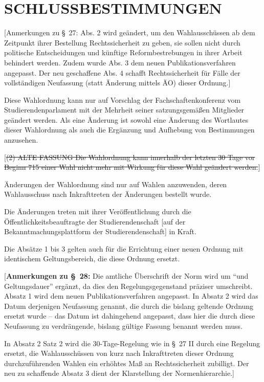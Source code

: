 \documentclass[%
draft,%
multilinesections%
]{fswo}
\newcommand\oldT[1]  {{\color{Gray}[\st{#1}]}}
\newcommand\newT[1]  {{\color{Green}[#1]}}
\newcommand\bemFr[1] {{\color{Red}[#1]}}
\newcommand\oldT[1]{}%
\newcommand\newT[1]{#1}
\newcommand\bemFr[1]{}%
\begin{document}
\section{SCHLUSSBESTIMMUNGEN}
\bemFr{Anmerkungen zu \S~27: Abs. 2 wird geändert, um den Wahlausschüssen ab dem Zeitpunkt ihrer Bestellung Rechtssicherheit zu geben, sie sollen nicht durch politische Entscheidungen und künftige Reformbestrebungen in ihrer Arbeit behindert werden.
Zudem wurde Abs. 3 dem neuen Publikationsverfahren angepasst. Der neu geschaffene Abs. 4 schafft Rechtssicherheit für Fälle der vollständigen Neufassung (statt Änderung mittels ÄO) dieser Ordnung.}

\begin{contract}
Diese Wahlordnung kann nur auf Vorschlag der Fachschaftenkonferenz vom Studierendenparlament mit der Mehrheit seiner satzungsgemäßen Mitglieder geändert werden.
Als eine Änderung ist sowohl eine Änderung des Wortlautes dieser Wahlordnung als auch die Ergänzung und Aufhebung von Bestimmungen anzusehen.
\begin{addmargin}{0pt}
\oldT{(2) ALTE FASSUNG Die Wahlordnung kann innerhalb der letzten 30 Tage vor Beginn 715 einer Wahl nicht mehr mit Wirkung für diese Wahl geändert werden.}
\end{addmargin}

Änderungen der Wahlordnung sind nur auf Wahlen anzuwenden, deren Wahlausschuss nach Inkrafttreten der Änderungen bestellt wurde.

Die Änderungen treten mit ihrer Veröffentlichung durch die Öffentlichkeitsbeauftragte der Studierendenschaft \newT{auf der Bekanntmachungsplattform der Studierendenschaft} in Kraft.

Die Absätze 1 bis 3 gelten auch für die Errichtung einer neuen Ordnung mit identischem Geltungsbereich, die diese Ordnung ersetzt.
\end{contract}

\bemFr{\textbf{Anmerkungen zu \S~28:}
Die amtliche Überschrift der Norm wird um \enquote{und Geltungsdauer} ergänzt, da dies den Regelungsgegenstand präziser umschreibt.
Absatz 1 wird dem neuen Publikationsverfahren angepasst.
In Absatz 2 wird das Datum derjenigen Neufassung genannt, die durch die bislang geltende Ordnung ersetzt wurde –
das Datum ist dahingehend angepasst, dass hier die durch diese Neufassung zu verdrängende, bislang gültige Fassung benannt werden muss.

In Absatz 2 Satz 2 wird die 30-Tage-Regelung wie in \S~27 II durch eine Regelung ersetzt, die Wahlausschüssen von kurz nach Inkrafttreten dieser Ordnung durchzuführenden Wahlen ein erhöhtes Maß an Rechtssicherheit zubilligt. Der neu zu schaffende Absatz 3 dient der Klarstellung der Normenhierarchie.}
\end{document}
